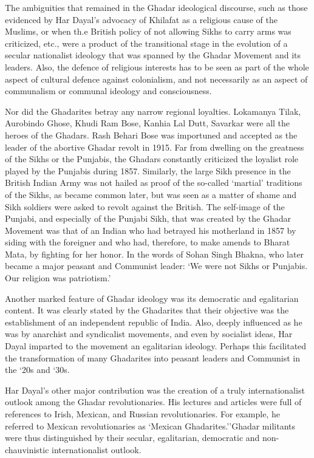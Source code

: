 The ambiguities that remained in the Ghadar ideological discourse, such as those evidenced by Har Dayal's advocacy of Khilafat as a religious cause of the Muslims, or when th.e British policy of not allowing Sikhs to carry arms was criticized, etc., were a product of the transitional stage in the evolution of a secular nationalist ideology that was spanned by the Ghadar Movement and its leaders. Also, the defence of religious interests has to be seen as part of the whole aspect of cultural defence against colonialism, and not necessarily as an aspect of communalism or communal ideology and consciousness.

Nor did the Ghadarites betray any narrow regional loyalties. Lokamanya Tilak, Aurobindo Ghose, Khudi Ram Bose, Kanhia Lal Dutt, Savarkar were all the heroes of the Ghadars. Rash Behari Bose was importuned and accepted as the leader of the abortive Ghadar revolt in 1915. Far from dwelling on the greatness of the Sikhs or the Punjabis, the Ghadars constantly criticized the loyalist role played by the Punjabis during 1857. Similarly, the large Sikh presence in the British Indian Army was not hailed as proof of the so-called `martial' traditions of the Sikhs, as became common later, but was seen as a matter of shame and Sikh soldiers were asked to revolt against the British. The self-image of the Punjabi, and especially of the Punjabi Sikh, that was created by the Ghadar Movement was that of an Indian who had betrayed his motherland in 1857 by siding with the foreigner and who had, therefore, to make amends to Bharat Mata, by fighting for her honor. In the words of Sohan Singh Bhakna, who later became a major peasant and Communist leader: `We were not Sikhs or Punjabis. Our religion was patriotism.'

Another marked feature of Ghadar ideology was its democratic and egalitarian content. It was clearly stated by the Ghadarites that their objective was the establishment of an independent republic of India. Also, deeply influenced as he was by anarchist and syndicalist movements, and even by socialist ideas, Har Dayal imparted to the movement an egalitarian ideology. Perhaps this facilitated the transformation of many Ghadarites into peasant leaders and Communist in the `20s and `30s.

Har Dayal's other major contribution was the creation of a truly internationalist outlook among the Ghadar revolutionaries. His lectures and articles were full of references to Irish, Mexican, and Russian revolutionaries. For example, he referred to Mexican revolutionaries as `Mexican Ghadarites.''Ghadar militants were thus distinguished by their secular, egalitarian, democratic and non-chauvinistic internationalist outlook.


